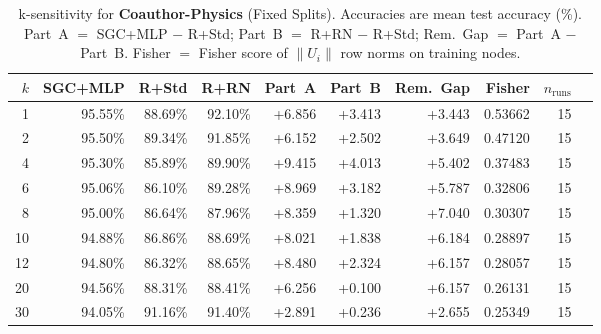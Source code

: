 \begin{table}[t]
\centering\small\setlength{\tabcolsep}{5pt}
\caption{k-sensitivity for \textbf{Coauthor-Physics} (Fixed Splits). Accuracies are mean test accuracy (\%). Part~A $=$ SGC+MLP $-$ R+Std; Part~B $=$ R+RN $-$ R+Std; Rem.~Gap $=$ Part~A $-$ Part~B. Fisher $=$ Fisher score of $\|U_i\|$ row norms on training nodes.}
\label{tab:exp8_per_dataset_coauthor-physics_fixed}
\begin{tabular}{rrrrrrrrrr}
\toprule
$k$ & SGC+MLP & R+Std & R+RN & Part~A & Part~B & Rem.~Gap & Fisher & $n_{\mathrm{runs}}$ \\
\midrule
1 & 95.55\% & 88.69\% & 92.10\% & +6.856 & +3.413 & +3.443 & 0.53662 & 15 \\
2 & 95.50\% & 89.34\% & 91.85\% & +6.152 & +2.502 & +3.649 & 0.47120 & 15 \\
4 & 95.30\% & 85.89\% & 89.90\% & +9.415 & +4.013 & +5.402 & 0.37483 & 15 \\
6 & 95.06\% & 86.10\% & 89.28\% & +8.969 & +3.182 & +5.787 & 0.32806 & 15 \\
8 & 95.00\% & 86.64\% & 87.96\% & +8.359 & +1.320 & +7.040 & 0.30307 & 15 \\
10 & 94.88\% & 86.86\% & 88.69\% & +8.021 & +1.838 & +6.184 & 0.28897 & 15 \\
12 & 94.80\% & 86.32\% & 88.65\% & +8.480 & +2.324 & +6.157 & 0.28057 & 15 \\
20 & 94.56\% & 88.31\% & 88.41\% & +6.256 & +0.100 & +6.157 & 0.26131 & 15 \\
30 & 94.05\% & 91.16\% & 91.40\% & +2.891 & +0.236 & +2.655 & 0.25349 & 15 \\
\bottomrule
\end{tabular}
\end{table}
